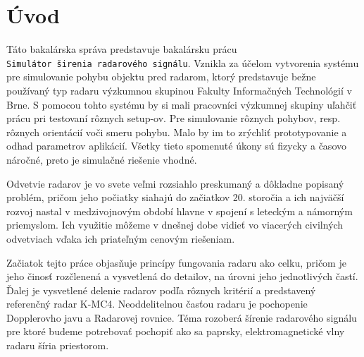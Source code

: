 




%
%



%

\chapter{Úvod}
  \hspace{0.6cm}Táto bakalárska správa predstavuje bakalársku prácu \\\verb|Simulátor širenia radarového signálu|.
  Vznikla za účelom vytvorenia systému pre simulovanie pohybu objektu pred radarom, ktorý predstavuje bežne používaný typ radaru výzkumnou skupinou Fakulty Informačných Technológií v Brne. S pomocou tohto systému by si mali pracovníci výzkumnej skupiny uľahčiť prácu pri testovaní rôznych setup-ov. Pre simulovanie rôznych pohybov, resp. rôznych orientácií voči smeru pohybu. Malo by im to zrýchliť prototypovanie a odhad parametrov aplikácií. Všetky tieto spomenuté úkony sú fizycky a časovo náročné, preto je simulačné riešenie vhodné. 

  Odvetvie radarov je vo svete veľmi rozsiahlo preskumaný a dôkladne popisaný problém, pričom jeho počiatky siahajú do začiatkov 20. storočia a ich najväčší rozvoj nastal v medzivojnovým období hlavne v spojení s leteckým a námorným priemyslom.   
  Ich využitie môžeme v dnešnej dobe vidieť vo viacerých civilných odvetviach vďaka ich priateľným cenovým riešeniam.

  Začiatok tejto práce objasňuje princípy fungovania radaru ako celku, pričom je jeho činosť rozčlenená a vysvetlená do detailov, na úrovni jeho jednotlivých častí. Ďalej je vysvetlené delenie radarov podľa rôznych kritérií a predstavený referenčný radar K-MC4. Neoddelitelnou časťou radaru je pochopenie Dopplerovho javu a Radarovej rovnice. Téma rozoberá šírenie radarového signálu pre ktoré budeme potrebovať pochopiť ako sa paprsky, elektromagnetické vlny radaru šíria priestorom.

